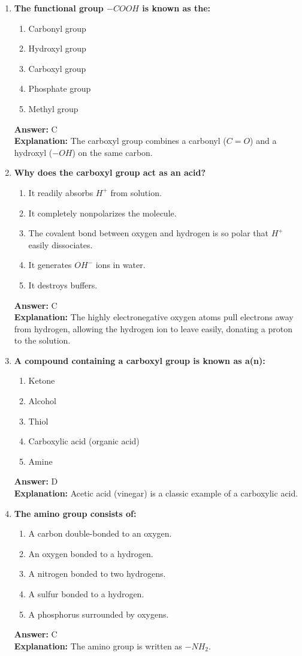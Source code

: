 \documentclass[11pt, a4paper]{article}
\begin{document}
\begin{enumerate}
\item \textbf{The functional group $-COOH$ is known as the:}
\begin{enumerate}[label=\Alph*.]
    \item Carbonyl group
    \item Hydroxyl group
    \item Carboxyl group
    \item Phosphate group
    \item Methyl group
\end{enumerate}
\textbf{Answer:} C \\
\textbf{Explanation:} The carboxyl group combines a carbonyl ($C=O$) and a hydroxyl ($-OH$) on the same carbon.

\item \textbf{Why does the carboxyl group act as an acid?}
\begin{enumerate}[label=\Alph*.]
    \item It readily absorbs $H^+$ from solution.
    \item It completely nonpolarizes the molecule.
    \item The covalent bond between oxygen and hydrogen is so polar that $H^+$ easily dissociates.
    \item It generates $OH^-$ ions in water.
    \item It destroys buffers.
\end{enumerate}
\textbf{Answer:} C \\
\textbf{Explanation:} The highly electronegative oxygen atoms pull electrons away from hydrogen, allowing the hydrogen ion to leave easily, donating a proton to the solution.

\item \textbf{A compound containing a carboxyl group is known as a(n):}
\begin{enumerate}[label=\Alph*.]
    \item Ketone
    \item Alcohol
    \item Thiol
    \item Carboxylic acid (organic acid)
    \item Amine
\end{enumerate}
\textbf{Answer:} D \\
\textbf{Explanation:} Acetic acid (vinegar) is a classic example of a carboxylic acid.

\item \textbf{The amino group consists of:}
\begin{enumerate}[label=\Alph*.]
    \item A carbon double-bonded to an oxygen.
    \item An oxygen bonded to a hydrogen.
    \item A nitrogen bonded to two hydrogens.
    \item A sulfur bonded to a hydrogen.
    \item A phosphorus surrounded by oxygens.
\end{enumerate}
\textbf{Answer:} C \\
\textbf{Explanation:} The amino group is written as $-NH_2$.


\end{enumerate}
\end{document}
